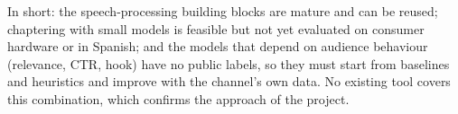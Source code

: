 \documentclass[ENG]{TFUOC}
\begin{document}
In short: the speech-processing building blocks are mature and can be reused; chaptering with small models is feasible but not yet evaluated on consumer hardware or in Spanish; and the models that depend on audience behaviour (relevance, CTR, hook) have no public labels, so they must start from baselines and heuristics and improve with the channel's own data. No existing tool covers this combination, which confirms the approach of the project.



\end{document}
